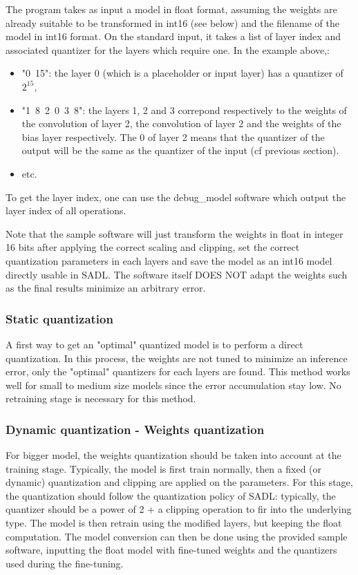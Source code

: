 \documentclass[10pt,a4paper]{article}
\begin{document}
The program takes as input a model in float format, assuming the weights are already suitable to be transformed in int16 (see below) and the filename of the model in int16 format.
On the standard input, it takes a list of layer index and associated quantizer for the layers which require one.
In the example above,:
\begin{itemize}
\item "0\ 15": the layer 0 (which is a placeholder or input layer) has a quantizer of $2^{15}$,
\item "1\ 8\ 2\ 0\ 3\ 8": the layers 1, 2 and 3 correpond respectively to the weights of the convolution of layer 2, the convolution of layer 2 and the weights of the bias layer respectively. The 0 of layer 2 means that the quantizer of the output will be the same as the quantizer of the input (cf previous section).
\item etc.
\end{itemize}

To get the layer index, one can use the debug\_model software which output the layer index of all operations.

Note that the sample software will just transform the weights in float in integer 16 bits after applying the correct scaling and clipping, set the correct quantization parameters in each layers and save the model as an int16 model directly usable in SADL. The software itself DOES NOT adapt the weights such as the final results minimize an arbitrary error. 

\subsubsection{Static quantization}
A first way to get an "optimal" quantized model is to perform a direct quantization. In this process, the weights are not tuned to minimize an inference error, only the "optimal" quantizers for each layers are found. This method works well for small to medium size models since the error accumulation stay low.
No retraining stage is necessary for this method.

\subsubsection{Dynamic quantization - Weights quantization}
For bigger model, the weights quantization should be taken into account at the training stage. Typically, the model is first train normally, then a fixed (or dynamic) quantization and clipping are applied on the parameters. For this stage, the quantization should follow the quantization policy of SADL: typically, the quantizer should be a power of 2 + a clipping operation to fir into the underlying type.
The model is then retrain using the modified layers, but keeping the float computation.
The model conversion can then be done using the provided sample software, inputting the float model with fine-tuned weights and the quantizers used during the fine-tuning.
\end{document}
